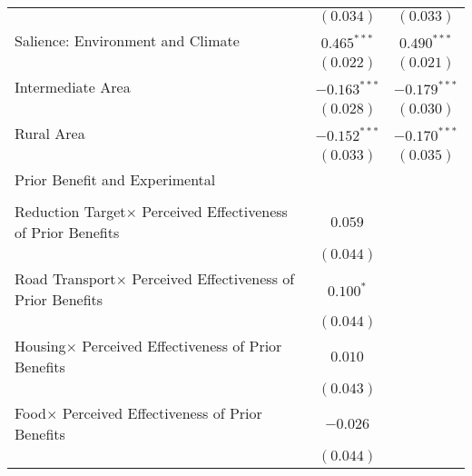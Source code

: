 \begin{center}
\begin{tiny}
\begin{longtable}{l@{} c@{} c@{}}
                                                                           & $(0.034)$        & $(0.033)$        \\
\quad Salience: Environment and Climate                                    & $0.465^{***}$    & $0.490^{***}$    \\
                                                                           & $(0.022)$        & $(0.021)$        \\
\quad Intermediate Area                                                    & $-0.163^{***}$   & $-0.179^{***}$   \\
                                                                           & $(0.028)$        & $(0.030)$        \\
\quad Rural Area                                                           & $-0.152^{***}$   & $-0.170^{***}$   \\
                                                                           & $(0.033)$        & $(0.035)$        \\
Prior Benefit and Experimental                                             &                  &                  \\
                                                                           &                  &                  \\
\quad Reduction Target$\times$ Perceived Effectiveness of Prior Benefits   & $0.059$          &                  \\
                                                                           & $(0.044)$        &                  \\
\quad Road Transport$\times$ Perceived Effectiveness of Prior Benefits     & $0.100^{*}$      &                  \\
                                                                           & $(0.044)$        &                  \\
\quad Housing$\times$ Perceived Effectiveness of Prior Benefits            & $0.010$          &                  \\
                                                                           & $(0.043)$        &                  \\
\quad Food$\times$ Perceived Effectiveness of Prior Benefits               & $-0.026$         &                  \\
                                                                           & $(0.044)$        &                  \\

\end{longtable}
\end{tiny}
\end{center}
